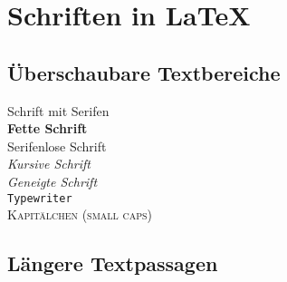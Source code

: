 \documentclass[10pt, a4paper]{article}
\begin{document}
\section{Schriften in \LaTeX}

\subsection{Überschaubare Textbereiche}

\textrm{Schrift mit Serifen} \\
\textbf{Fette Schrift}\\
\textsf{Serifenlose Schrift}\\
\textit{Kursive Schrift}\\
\textsl{Geneigte Schrift}\\
\texttt{Typewriter}\\
\textsc{Kapitälchen (small caps)}

\subsection{Längere Textpassagen}

{\ttfamily \blindtext}

\begingroup \sffamily \blindtext \endgroup

{\bfseries \blindtext}

{\itshape \blindtext}

{\slshape \blindtext}

{\scshape \blindtext}
\end{document}
